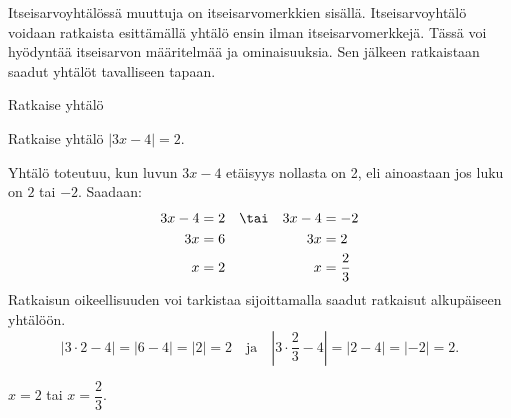 
Itseisarvoyhtälössä muuttuja on itseisarvomerkkien sisällä. Itseisarvoyhtälö voidaan ratkaista esittämällä yhtälö ensin ilman itseisarvomerkkejä. Tässä voi hyödyntää itseisarvon määritelmää ja ominaisuuksia. Sen jälkeen ratkaistaan saadut yhtälöt tavalliseen tapaan.


\begin{esimerkki}
	Ratkaise yhtälö
	\begin{esimratk}
	\end{esimratk}
\end{esimerkki}

\begin{esimerkki}
	Ratkaise yhtälö $|3x-4|=2$.
	\begin{esimratk}
		Yhtälö toteutuu, kun luvun $3x-4$ etäisyys nollasta on 2, eli ainoastaan jos luku on $2$ tai $-2$. Saadaan:
		\begin{align*}
			3x-4 & =2 & & \tai & 3x-4 & =-2 \\
			3x & =6 && & 3x & = 2 \\
			x & =2 && & x & =\frac{2}{3}
		\end{align*}
		Ratkaisun oikeellisuuden voi tarkistaa sijoittamalla saadut ratkaisut alkupäiseen yhtälöön.
		\[ |3\cdot2-4|=|6-4|=|2|=2 \quad \text{ja} \quad
			\left|3\cdot\frac{2}{3}-4\right|=|2-4|=|-2|=2. \]
	\end{esimratk}
	\begin{esimvast}
		$x=2$ tai $x=\dfrac{2}{3}$.
	\end{esimvast}
\end{esimerkki}

